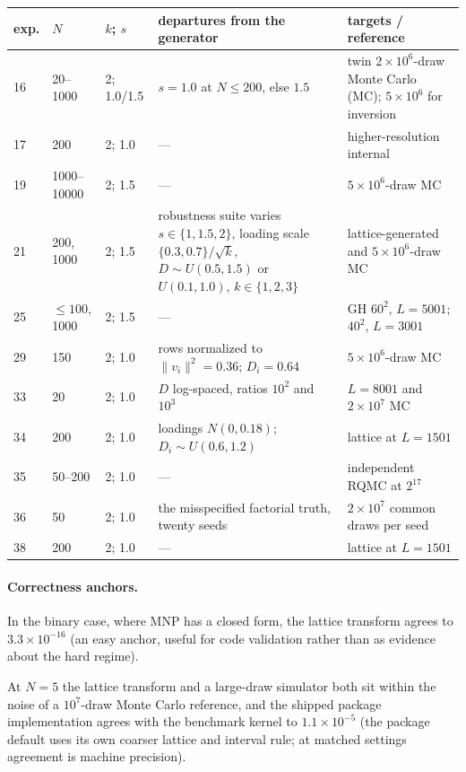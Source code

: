 \documentclass[12pt]{article}
\theoremstyle{remark}
\begin{document}
\begin{center}
\footnotesize
\setlength{\tabcolsep}{4pt}
\renewcommand{\arraystretch}{1.15}
\begin{tabular}{lllp{4.6cm}p{3.4cm}}
\toprule
exp. & $N$ & $k$; $s$ & departures from the generator & targets / reference \\
\midrule
16 & 20--1000 & 2; 1.0/1.5 & $s = 1.0$ at $N \le 200$, else $1.5$ & twin $2{\times}10^6$-draw Monte Carlo (MC); $5{\times}10^6$ for inversion \\
17 & 200 & 2; 1.0 & --- & higher-resolution internal \\
19 & 1000--10000 & 2; 1.5 & --- & $5{\times}10^6$-draw MC \\
21 & 200, 1000 & 2; 1.5 & robustness suite varies $s \in \{1, 1.5, 2\}$, loading scale $\{0.3, 0.7\}/\sqrt{k}$, $D \sim U(0.5,1.5)$ or $U(0.1,1.0)$, $k \in \{1,2,3\}$ & lattice-generated and $5{\times}10^6$-draw MC \\
25 & $\le100$, 1000 & 2; 1.5 & --- & GH $60^2$, $L{=}5001$; $40^2$, $L{=}3001$ \\
29 & 150 & 2; 1.0 & rows normalized to $\|v_i\|^2 = 0.36$; $D_i = 0.64$ & $5{\times}10^6$-draw MC \\
33 & 20 & 2; 1.0 & $D$ log-spaced, ratios $10^2$ and $10^3$ & $L = 8001$ and $2{\times}10^7$ MC \\
34 & 200 & 2; 1.0 & loadings $N(0, 0.18)$; $D_i \sim U(0.6, 1.2)$ & lattice at $L = 1501$ \\
35 & 50--200 & 2; 1.0 & --- & independent RQMC at $2^{17}$ \\
36 & 50 & 2; 1.0 & the misspecified factorial truth, twenty seeds & $2{\times}10^7$ common draws per seed \\
38 & 200 & 2; 1.0 & --- & lattice at $L = 1501$ \\
\bottomrule
\end{tabular}
\end{center}

\paragraph{Correctness anchors.} In the binary case, where MNP has a
closed form, the lattice transform agrees to $3.3\times10^{-16}$ (an easy
anchor, useful for code validation rather than as evidence about the hard
regime).

At $N=5$ the lattice transform and a large-draw simulator both sit
within the noise of a $10^7$-draw Monte Carlo reference, and the shipped
package implementation agrees with the benchmark kernel to
$1.1\times10^{-5}$ (the package default uses its own coarser lattice
and interval rule; at matched settings agreement is machine precision).
\end{document}
